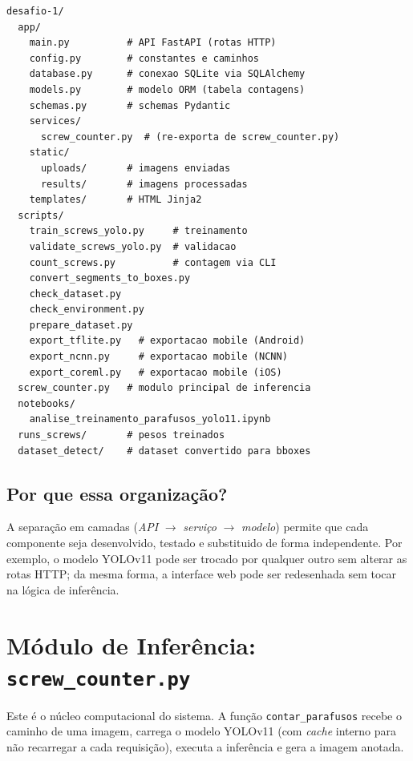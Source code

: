 \documentclass[12pt,a4paper]{article}
\begin{document}
\begin{verbatim}
desafio-1/
  app/
    main.py          # API FastAPI (rotas HTTP)
    config.py        # constantes e caminhos
    database.py      # conexao SQLite via SQLAlchemy
    models.py        # modelo ORM (tabela contagens)
    schemas.py       # schemas Pydantic
    services/
      screw_counter.py  # (re-exporta de screw_counter.py)
    static/
      uploads/       # imagens enviadas
      results/       # imagens processadas
    templates/       # HTML Jinja2
  scripts/
    train_screws_yolo.py     # treinamento
    validate_screws_yolo.py  # validacao
    count_screws.py          # contagem via CLI
    convert_segments_to_boxes.py
    check_dataset.py
    check_environment.py
    prepare_dataset.py
    export_tflite.py   # exportacao mobile (Android)
    export_ncnn.py     # exportacao mobile (NCNN)
    export_coreml.py   # exportacao mobile (iOS)
  screw_counter.py   # modulo principal de inferencia
  notebooks/
    analise_treinamento_parafusos_yolo11.ipynb
  runs_screws/       # pesos treinados
  dataset_detect/    # dataset convertido para bboxes
\end{verbatim}

\subsection{Por que essa organiza\c{c}\~ao?}

A separa\c{c}\~ao em camadas (\emph{API} $\to$ \emph{servi\c{c}o} $\to$ \emph{modelo})
permite que cada componente seja desenvolvido, testado e substituido de forma independente.
Por exemplo, o modelo YOLOv11 pode ser trocado por qualquer outro sem alterar as rotas
HTTP; da mesma forma, a interface web pode ser redesenhada sem tocar na l\'ogica de
infer\^encia.

\section{M\'odulo de Infer\^encia: \texttt{screw\_counter.py}}

Este \'e o n\'ucleo computacional do sistema. A fun\c{c}\~ao \texttt{contar\_parafusos}
recebe o caminho de uma imagem, carrega o modelo YOLOv11 (com \emph{cache} interno para
n\~ao recarregar a cada requisi\c{c}\~ao), executa a infer\^encia e gera a imagem anotada.
\end{document}
